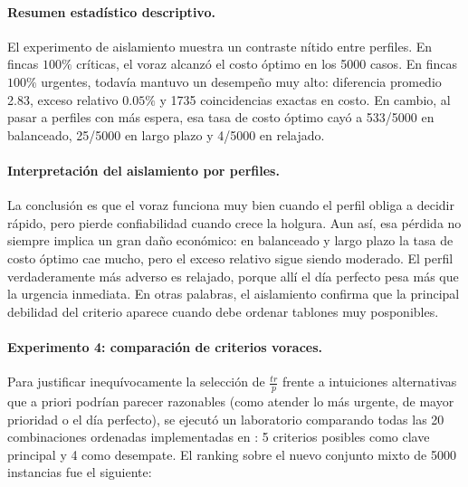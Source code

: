 \documentclass[12pt,a4paper]{article}
\begin{document}
\paragraph{Resumen estad\'istico descriptivo.}
El experimento de aislamiento muestra un contraste n\'itido entre perfiles. En fincas \(100\%\) cr\'iticas, el voraz alcanz\'o el costo \'optimo en los 5000 casos. En fincas \(100\%\) urgentes, todav\'ia mantuvo un desempe\~no muy alto: diferencia promedio 2.83, exceso relativo \(0.05\%\) y 1735 coincidencias exactas en costo. En cambio, al pasar a perfiles con m\'as espera, esa tasa de costo \'optimo cay\'o a 533/5000 en balanceado, 25/5000 en largo plazo y 4/5000 en relajado.

\paragraph{Interpretaci\'on del aislamiento por perfiles.}
La conclusi\'on es que el voraz funciona muy bien cuando el perfil obliga a decidir r\'apido, pero pierde confiabilidad cuando crece la holgura. Aun as\'i, esa p\'erdida no siempre implica un gran da\~no econ\'omico: en balanceado y largo plazo la tasa de costo \'optimo cae mucho, pero el exceso relativo sigue siendo moderado. El perfil verdaderamente m\'as adverso es relajado, porque all\'i el d\'ia perfecto pesa m\'as que la urgencia inmediata. En otras palabras, el aislamiento confirma que la principal debilidad del criterio aparece cuando debe ordenar tablones muy posponibles.

\paragraph{Experimento 4: comparaci\'on de criterios voraces.}
Para justificar inequ\'ivocamente la selecci\'on de \(\frac{tr}{p}\) frente a intuiciones alternativas que a priori podr\'ian parecer razonables (como atender lo m\'as urgente, de mayor prioridad o el d\'ia perfecto), se ejecut\'o un laboratorio comparando todas las 20 combinaciones ordenadas implementadas en : 5 criterios posibles como clave principal y 4 como desempate. El ranking sobre el nuevo conjunto mixto de 5000 instancias fue el siguiente:
\end{document}

